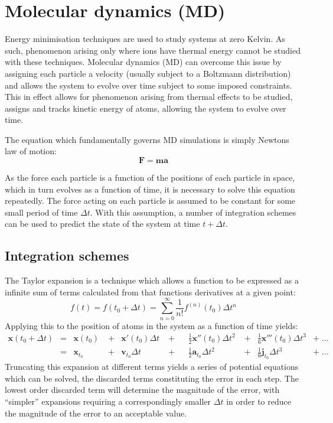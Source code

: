 \section{Molecular dynamics (MD)}
\label{sec:MD}
Energy minimisation techniques are used to study systems at zero Kelvin.
As such, phenomenon arising only where ions have thermal energy cannot be studied with these techniques.
Molecular dynamics (MD) can overcome this issue by assigning each particle a velocity (usually subject to a Boltzmann distribution) and allows the system to evolve over time subject to some imposed constraints.
This in effect allows for phenomenon arising from thermal effects to be studied,
assigns and tracks kinetic energy of atoms, allowing the system to evolve over time.

The equation which fundamentally governs MD simulations is simply Newtons law of motion:
\begin{equation}
	\mathbf{F} = \mathbf{ma}
\end{equation}

As the force each particle is a function of the positions of each particle in space, which in turn evolves as a function of time, it is necessary to solve this equation repeatedly.
The force acting on each particle is assumed to be constant for some small period of time $\Delta t$.
With this assumption, a number of integration schemes can be used to predict the state of the system at time $t +\Delta t$.
\newpage
\subsection{Integration schemes}
The Taylor expansion is a technique which allows a function to be expressed as a infinite sum of terms calculated from that functions derivatives at a given point:
\begin{equation}
f(t) = f(t_0 + \Delta t) = \sum_{n=0}^\infty \frac{1}{n!}f^{(n)}(t_0)\Delta t^n
\end{equation}
Applying this to the position of atoms in the system as a function of time yields:
\begin{align}
\mathbf{x}(t_0 + \Delta t) &= &\mathbf{x}(t_0) \; &+ &\mathbf{x}'(t_0)\Delta t \;&+& &\frac{1}{2}\mathbf{x}''(t_0)\Delta t^2 \;&+& \frac{1}{6}\mathbf{x}'''(t_0)\Delta t^3& +\;\dots\\
                           &= &\mathbf{x}_{t_0} \; &+  &\mathbf{v}_{t_0}\Delta t \;&+&   &\frac{1}{2}\mathbf{a}_{t_0}\Delta t^2     \;&+& \frac{1}{6}\mathbf{j}_{t_0}\Delta t^3& +\;\dots
\end{align}
Truncating this expansion at different terms yields a series of potential equations which can be solved, the discarded terms constituting the error in each step.
The lowest order discarded term will determine the magnitude of the error, with ``simpler'' expansions requiring a correspondingly smaller $\Delta t$ in order to reduce the magnitude of the error to an acceptable value.

